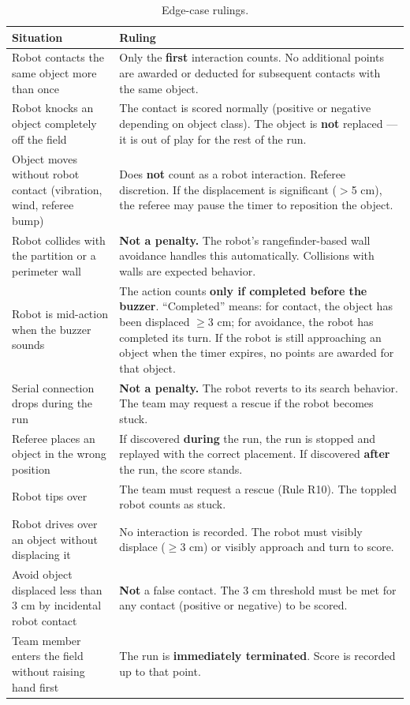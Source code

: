 \documentclass[a4]{article}
\begin{document}
\begin{table}[H]
\centering
\begin{tabular}{p{5cm}p{8cm}}
\toprule
\textbf{Situation} & \textbf{Ruling} \\
\midrule
Robot contacts the same object more than once & Only the \textbf{first} interaction counts. No additional points are awarded or deducted for subsequent contacts with the same object. \\
\addlinespace
Robot knocks an object completely off the field & The contact is scored normally (positive or negative depending on object class). The object is \textbf{not} replaced --- it is out of play for the rest of the run. \\
\addlinespace
Object moves without robot contact (vibration, wind, referee bump) & Does \textbf{not} count as a robot interaction. Referee discretion. If the displacement is significant ($>$5 cm), the referee may pause the timer to reposition the object. \\
\addlinespace
Robot collides with the partition or a perimeter wall & \textbf{Not a penalty.} The robot's rangefinder-based wall avoidance handles this automatically. Collisions with walls are expected behavior. \\
\addlinespace
Robot is mid-action when the buzzer sounds & The action counts \textbf{only if completed before the buzzer}. ``Completed'' means: for contact, the object has been displaced $\geq$3 cm; for avoidance, the robot has completed its turn. If the robot is still approaching an object when the timer expires, no points are awarded for that object. \\
\addlinespace
Serial connection drops during the run & \textbf{Not a penalty.} The robot reverts to its search behavior. The team may request a rescue if the robot becomes stuck. \\
\addlinespace
Referee places an object in the wrong position & If discovered \textbf{during} the run, the run is stopped and replayed with the correct placement. If discovered \textbf{after} the run, the score stands. \\
\addlinespace
Robot tips over & The team must request a rescue (Rule R10). The toppled robot counts as stuck. \\
\addlinespace
Robot drives over an object without displacing it & No interaction is recorded. The robot must visibly displace ($\geq$3 cm) or visibly approach and turn to score. \\
\addlinespace
Avoid object displaced less than 3 cm by incidental robot contact & \textbf{Not} a false contact. The 3 cm threshold must be met for any contact (positive or negative) to be scored. \\
\addlinespace
Team member enters the field without raising hand first & The run is \textbf{immediately terminated}. Score is recorded up to that point. \\
\bottomrule
\end{tabular}
\caption{Edge-case rulings.}
\end{table}
\end{document}
